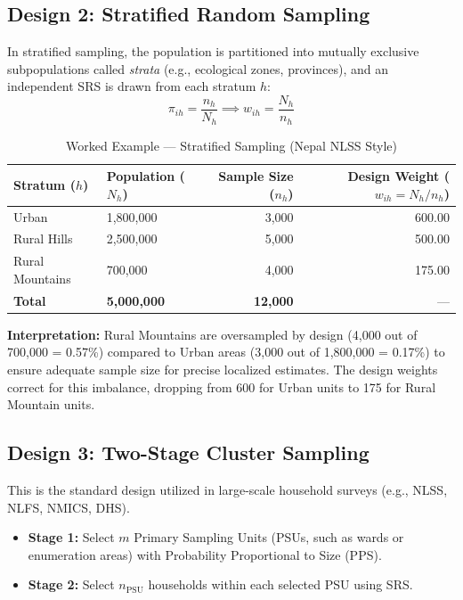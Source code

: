 \documentclass[11pt,a4paper]{article}
\begin{document}
\subsection{Design 2: Stratified Random Sampling}
In stratified sampling, the population is partitioned into mutually exclusive subpopulations called \textit{strata} (e.g., ecological zones, provinces), and an independent SRS is drawn from each stratum $h$:
\begin{equation}
  \pi_{ih} = \frac{n_h}{N_h} \implies w_{ih} = \frac{N_h}{n_h}
\end{equation}

\begin{table}[htbp]
  \centering
  \caption{Worked Example --- Stratified Sampling (Nepal NLSS Style)}
  \label{tab:stratified_example}
  \begin{tabular}{llrr}
    \toprule
    \textbf{Stratum ($h$)} & \textbf{Population ($N_h$)} & \textbf{Sample Size ($n_h$)} & \textbf{Design Weight ($w_{ih} = N_h / n_h$)} \\
    \midrule
    Urban & 1,800,000 & 3,000 & 600.00 \\
    Rural Hills & 2,500,000 & 5,000 & 500.00 \\
    Rural Mountains & 700,000 & 4,000 & 175.00 \\
    \midrule
    \textbf{Total} & \textbf{5,000,000} & \textbf{12,000} & --- \\
    \bottomrule
  \end{tabular}
\end{table}
\textbf{Interpretation:} Rural Mountains are oversampled by design (4,000 out of 700,000 = 0.57\%) compared to Urban areas (3,000 out of 1,800,000 = 0.17\%) to ensure adequate sample size for precise localized estimates. The design weights correct for this imbalance, dropping from 600 for Urban units to 175 for Rural Mountain units.

\subsection{Design 3: Two-Stage Cluster Sampling}
This is the standard design utilized in large-scale household surveys (e.g., NLSS, NLFS, NMICS, DHS).
\begin{itemize}
  \item \textbf{Stage 1:} Select $m$ Primary Sampling Units (PSUs, such as wards or enumeration areas) with Probability Proportional to Size (PPS).
  \item \textbf{Stage 2:} Select $n_{\text{PSU}}$ households within each selected PSU using SRS.
\end{itemize}
\end{document}
